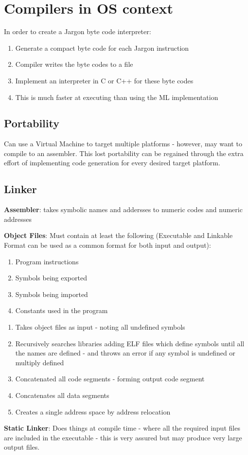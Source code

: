 \documentclass{article}
\newenvironment{definition}{\par\color{blue}}{\par}
\begin{document}
\section{Compilers in OS context}
In order to create a Jargon byte code interpreter:
\begin{enumerate}
	\item Generate a compact byte code for each Jargon instruction
	\item Compiler writes the byte codes to a file
	\item Implement an interpreter in C or C++ for these byte codes
	\item This is much faster at executing than using the ML implementation
\end{enumerate}

\subsection{Portability}
Can use a Virtual Machine to target multiple platforms - however, may want to compile to an assembler. This lost portability can be regained through the extra effort of implementing code generation for every desired target platform.

\subsection{Linker}
\begin{definition}
	\textbf{Assembler}: takes symbolic names and addersses to numeric codes and numeric addresses
	
	\bigskip
	\noindent
	\textbf{Object Files}: Must contain at least the following (Executable and Linkable Format can be used as a common format for both input and output): 
	\begin{enumerate}
		\item Program instructions
		\item Symbols being exported
		\item Symbols being imported
		\item Constants used in the program
	\end{enumerate}

\end{definition}

\begin{enumerate}
	\item Takes object files as input - noting all undefined symbols
	\item Recursively searches libraries adding ELF files which define symbols until all the names are defined - and throws an error if any symbol is undefined or multiply defined
	\item Concatenated all code segments - forming output code segment
	\item Concatenates all data segments
	\item Creates a single address space by address relocation
\end{enumerate}
\bigskip
\noindent
\textbf{Static Linker}: Does things at compile time - where all the required input files are included in the executable - this is very assured but may produce very large output files. 
\end{document}
